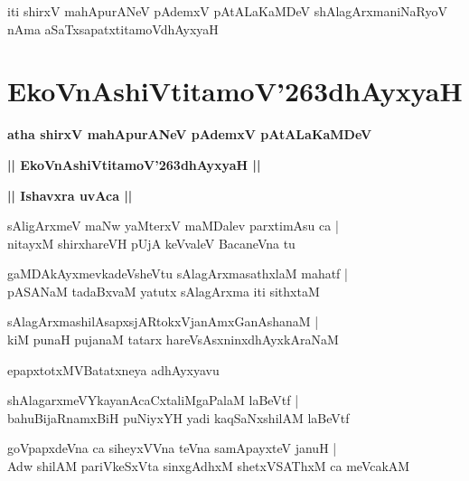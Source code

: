 \documentclass[twoside,12pt,openright]{book}
\def\S{\char'263}
\newcounter{shloka}[chapter]
\def\uvaca#1{\centerline{{\large\textbf{#1}}}}
\begin{document}
\begin{center}
iti shirxV mahApurANeV pAdemxV pAtALaKaMDeV shAlagArxmaniNaRyoV nAma 
aSaTxsapatxtitamoVdhAyxyaH
\end{center}

\chapter{EkoVnAshiVtitamoV\S dhAyxyaH}

\begin{center}
{\LARGE\bfseries atha shirxV mahApurANeV pAdemxV pAtALaKaMDeV }
\end{center}

\begin{center}         
{\LARGE\bfseries || EkoVnAshiVtitamoV\S dhAyxyaH ||}
\end{center}

\uvaca{|| Ishavxra uvAca ||}

\begin{shloka}%
sAligArxmeV maNw yaMterxV maMDalev parxtimAsu ca |\\
nitayxM shirxhareVH pUjA keVvaleV BacaneVna tu
\end{shloka}

\begin{shloka}%
gaMDAkAyxmevkadeVsheVtu sAlagArxmasathxlaM mahatf |\\
pASANaM tadaBxvaM yatutx sAlagArxma iti sithxtaM 
\end{shloka}

\begin{shloka}%
sAlagArxmashilAsapxsjARtokxVjanAmxGanAshanaM |\\
kiM punaH pujanaM tatarx hareVsAsxninxdhAyxkAraNaM 
\end{shloka}

\begin{center}
epapxtotxMVBatatxneya adhAyxyavu
\end{center}

\begin{shloka}%
shAlagarxmeVYkayanAcaCxtaliMgaPalaM laBeVtf |\\
bahuBijaRnamxBiH puNiyxYH yadi kaqSaNxshilAM laBeVtf
\end{shloka}

\begin{shloka}%
goVpapxdeVna ca siheyxVVna teVna samApayxteV januH |\\
Adw shilAM pariVkeSxVta sinxgAdhxM shetxVSAThxM ca meVcakAM 
\end{shloka}
\end{document}
